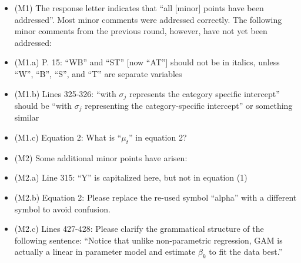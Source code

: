 \documentclass[
]{article}
\begin{document}
\begin{itemize}

\item (M1) The response letter indicates that ``all [minor] points have been addressed''. Most minor comments were addressed correctly. The following minor comments from the previous round, however, have not yet been addressed:

\item (M1.a) P. 15: ``WB'' and ``ST'' [now ``AT''] should not be in italics, unless ``W'', ``B'', ``S'', and ``T'' are separate variables

\item (M1.b) Lines 325-326: ``with $\sigma_j$ represents the category specific intercept'' should be ``with $\sigma_j$ representing the category-specific intercept'' or something similar

\item (M1.c) Equation 2: What is ``$\mu_t$'' in equation 2?

\item (M2) Some additional minor points have arisen:

\item (M2.a) Line 315: ``Y'' is capitalized here, but not in equation (1)

\item (M2.b) Equation 2: Please replace the re-used symbol ``alpha'' with a different symbol to avoid confusion.

\item (M2.c) Lines 427-428: Please clarify the grammatical structure of the following sentence: ``Notice that unlike non-parametric regression, GAM is actually a linear in parameter model and estimate $\beta_k$ to fit the data best.''

\end{itemize}
\end{document}
